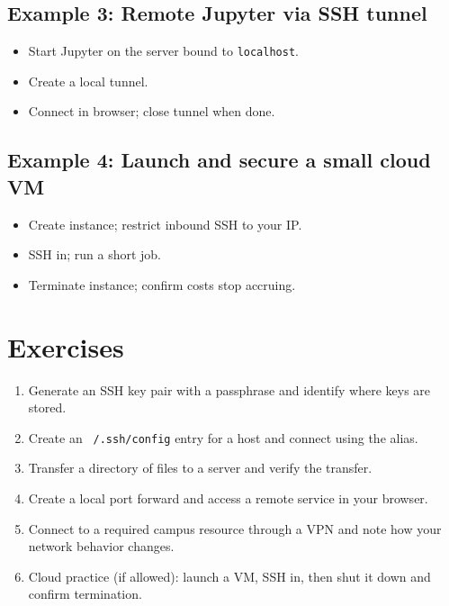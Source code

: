 \subsection{Example 3: Remote Jupyter via SSH tunnel}
\begin{itemize}
\item Start Jupyter on the server bound to \texttt{localhost}.
\item Create a local tunnel.
\item Connect in browser; close tunnel when done.
\end{itemize}

\subsection{Example 4: Launch and secure a small cloud VM}
\begin{itemize}
\item Create instance; restrict inbound SSH to your IP.
\item SSH in; run a short job.
\item Terminate instance; confirm costs stop accruing.
\end{itemize}

\section{Exercises}
\begin{enumerate}
\item Generate an SSH key pair with a passphrase and identify where keys are stored.
\item Create an \texttt{~/.ssh/config} entry for a host and connect using the alias.
\item Transfer a directory of files to a server and verify the transfer.
\item Create a local port forward and access a remote service in your browser.
\item Connect to a required campus resource through a VPN and note how your network behavior changes.
\item Cloud practice (if allowed): launch a VM, SSH in, then shut it down and confirm termination.
\end{enumerate}

